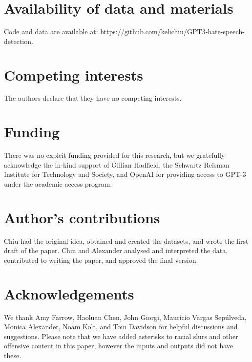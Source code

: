 \documentclass{bmcart}
\begin{document}
\begin{backmatter}

\section*{Availability of data and materials}
Code and data are available at: https://github.com/kelichiu/GPT3-hate-speech-detection. 

\section*{Competing interests}
  The authors declare that they have no competing interests.
  
\section*{Funding}
There was no explcit funding provided for this research, but we gratefully acknowledge the in-kind support of Gillian Hadfield, the Schwartz Reisman Institute for Technology and Society, and OpenAI for providing access to GPT-3 under the academic access program. 

\section*{Author's contributions}
  Chiu had the original idea, obtained and created the datasets, and wrote the first draft of the paper. Chiu and Alexander analysed and interpreted the data, contributed to writing the paper, and approved the final version.

\section*{Acknowledgements}
  We thank Amy Farrow, Haoluan Chen, John Giorgi, Mauricio Vargas Sepúlveda, Monica Alexander, Noam Kolt, and Tom Davidson for helpful discussions and suggestions. Please note that we have added asterisks to racial slurs and other offensive content in this paper, however the inputs and outputs did not have these.


\end{backmatter}
\end{document}
